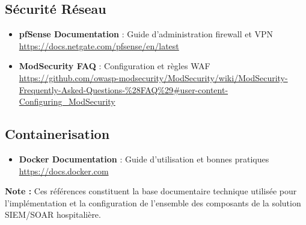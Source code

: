 \subsection*{Sécurité Réseau}
\begin{itemize}
    \item \textbf{pfSense Documentation} : Guide d'administration firewall et VPN \\
          \url{https://docs.netgate.com/pfsense/en/latest}

    \item \textbf{ModSecurity FAQ} : Configuration et règles WAF \\
          \url{https://github.com/owasp-modsecurity/ModSecurity/wiki/ModSecurity-Frequently-Asked-Questions-%28FAQ%29#user-content-Configuring_ModSecurity}
\end{itemize}

\subsection*{Containerisation}
\begin{itemize}
    \item \textbf{Docker Documentation} : Guide d'utilisation et bonnes pratiques \\
          \url{https://docs.docker.com}
\end{itemize}

\vspace{1cm}

\textbf{Note :} Ces références constituent la base documentaire technique utilisée pour l'implémentation et la configuration de l'ensemble des composants de la solution SIEM/SOAR hospitalière.

\clearpage
